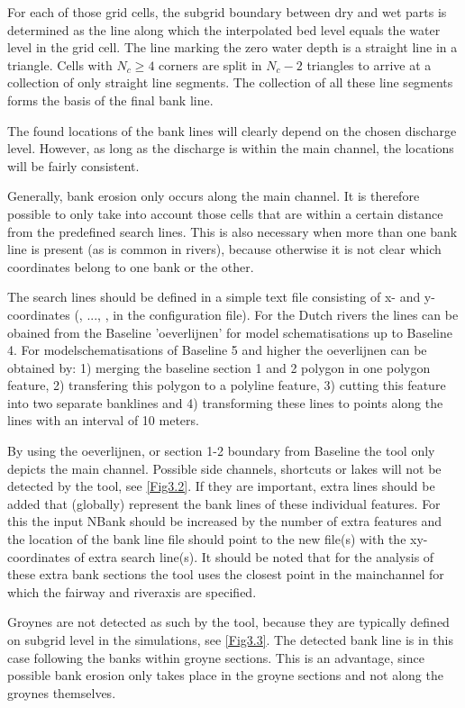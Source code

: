 For each of those grid cells, the subgrid boundary between dry and wet parts is determined as the line along which the interpolated bed level equals the water level in the grid cell.
The line marking the zero water depth is a straight line in a triangle.
Cells with $N_c \ge 4$ corners are split in $N_c - 2$ triangles to arrive at a collection of only straight line segments.
The collection of all these line segments forms the basis of the final bank line.

The found locations of the bank lines will clearly depend on the chosen discharge level.
However, as long as the discharge is within the main channel, the locations will be fairly consistent.

Generally, bank erosion only occurs along the main channel.
It is therefore possible to only take into account those cells that are within a certain distance from the predefined search lines.
This is also necessary when more than one bank line is present (as is common in rivers), because otherwise it is not clear which coordinates belong to one bank or the other.

The search lines should be defined in a simple text file consisting of x- and y- coordinates (, ..., , in the configuration file). For the Dutch rivers the lines can be obained from the Baseline 'oeverlijnen' for model schematisations up to Baseline 4. For modelschematisations of Baseline 5 and higher the oeverlijnen can be obtained by: 1) merging the baseline section 1 and 2 polygon in one polygon feature, 2) transfering this polygon to a polyline feature, 3) cutting this feature into two separate banklines and 4) transforming these lines to points along the lines with an interval of 10 meters.

By using the oeverlijnen, or section 1-2 boundary from Baseline the tool only depicts the main channel. Possible side channels, shortcuts or lakes will not be detected by the tool, see \autoref{Fig3.2}.
If they are important, extra lines should be added that (globally) represent the bank lines of these individual features. For this the input NBank should be increased by the number of extra features and the location of the bank line file  should point to the new file(s) with the xy-coordinates of extra search line(s). It should be noted that for the analysis of these extra bank sections the tool uses the closest point in the mainchannel for which the fairway and riveraxis are specified.

Groynes are not detected as such by the tool, because they are typically defined on subgrid level in the simulations, see \autoref{Fig3.3}.
The detected bank line is in this case following the banks within groyne sections.
This is an advantage, since possible bank erosion only takes place in the groyne sections and not along the groynes themselves.

